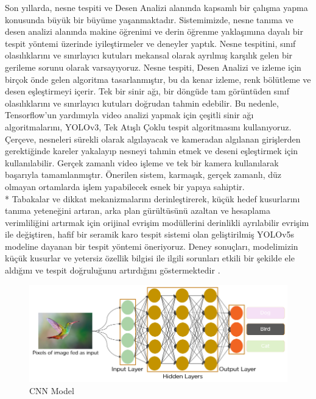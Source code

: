 \documentclass[12pt,a4paper]{article}
\begin{document}
\begin{enumerate}
		
		
		
		
		\clearpage
		
		
		Son yıllarda, nesne tespiti ve Desen Analizi alanında kapsamlı bir çalışma yapma konusunda büyük bir büyüme yaşanmaktadır. Sistemimizde, nesne tanıma ve desen analizi alanında makine öğrenimi ve derin öğrenme yaklaşımına dayalı bir tespit yöntemi üzerinde iyileştirmeler ve deneyler yaptık. Nesne tespitini, sınıf olasılıklarını ve sınırlayıcı kutuları mekansal olarak ayrılmış karşılık gelen bir gerileme sorunu olarak varsayıyoruz. Nesne tespiti, Desen Analizi ve izleme için birçok önde gelen algoritma tasarlanmıştır, bu da kenar izleme, renk bölütleme ve desen eşleştirmeyi içerir. Tek bir sinir ağı, bir döngüde tam görüntüden sınıf olasılıklarını ve sınırlayıcı kutuları doğrudan tahmin edebilir. Bu nedenle, Tensorflow'un yardımıyla video analizi yapmak için çeşitli sinir ağı algoritmalarını, YOLOv3, Tek Atışlı Çoklu tespit algoritmasını kullanıyoruz. Çerçeve, nesneleri sürekli olarak algılayacak ve kameradan algılanan girişlerden gerektiğinde kareler yakalayıp nesneyi tahmin etmek ve deseni eşleştirmek için kullanılabilir. Gerçek zamanlı video işleme ve tek bir kamera kullanılarak başarıyla tamamlanmıştır. Önerilen sistem, karmaşık, gerçek zamanlı, düz olmayan ortamlarda işlem yapabilecek esnek bir yapıya sahiptir\cite{9076486}.			
		\\*				
		Tabakalar ve dikkat mekanizmalarını derinleştirerek, küçük hedef kusurlarını tanıma yeteneğini artıran, arka plan gürültüsünü azaltan ve hesaplama verimliliğini artırmak için orijinal evrişim modüllerini derinlikli ayrılabilir evrişim ile değiştiren, hafif bir seramik karo tespit sistemi olan geliştirilmiş YOLOv5s modeline dayanan bir tespit yöntemi öneriyoruz. Deney sonuçları, modelimizin küçük kusurlar ve yetersiz özellik bilgisi ile ilgili sorunları etkili bir şekilde ele aldığını ve tespit doğruluğunu artırdığını göstermektedir					
		\cite{WAN202211085}.\pagebreak
		
\begin{figure}[h]
	\centering
	\includegraphics[width=\textwidth]{bird.png}
	\caption{CNN Model}
	\label{fig:grafik}
\end{figure}
		

\end{enumerate}
\end{document}
